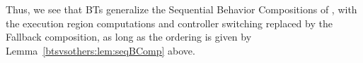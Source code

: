 Thus, we see that BTs generalize the Sequential Behavior Compositions of \cite{burridge1999sequential},
with the execution region computations and controller switching replaced by the Fallback composition,
as long as the ordering is given by Lemma~\ref{btsvsothers:lem:seqBComp} above.



%
%
%
%
%

